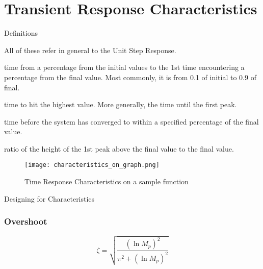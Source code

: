 \documentclass{../templates/topic}
\begin{document}
\graphicspath{{assets/}{ch3_Time_Domain_Performance_Characteristics/assets/}}

\chapter{Transient Response Characteristics}

\begin{section}{Definitions}
	
	All of these refer in general to the Unit Step Response.
	
	  time from a percentage from the initial values to the 1st time encountering a percentage from the final value. Most commonly, it is from 0.1 of initial to 0.9 of final.
	
	  time to hit the highest value. More generally, the time until the first peak.
	
	  time before the system has converged to within a specified percentage of the final value.
	
	 ratio of the height of the 1st peak above the final value to the final value.
	
	\begin{figure}[H]
		\texttt{[image: characteristics\_on\_graph.png]}
		\caption{Time Response Characteristics on a sample function}
	\end{figure}
	
\end{section}

\begin{section}{Designing for Characteristics}
	\subsection{Overshoot}
		\begin{equation*}
			\zeta = \sqrt{\frac{(\ln{M_p})^2}{\pi^2+(\ln{M_p})^2}}
		\end{equation*}
	
\end{section}
\end{document}
